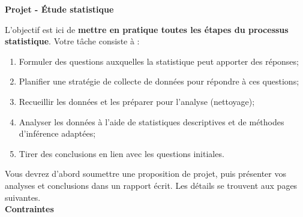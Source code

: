 \documentclass[11pt,french]{article}
\begin{document}
\vspace*{0.05 in}
\begin{center}
\textbf{Projet - Étude statistique} \\
\end{center}



\vspace{2mm}

L'objectif est ici de \textbf{mettre en pratique toutes les étapes du processus statistique}. Votre tâche consiste à :
\begin{enumerate}
\item Formuler des questions auxquelles la statistique peut apporter des réponses;
\item Planifier une stratégie de collecte de données pour répondre à ces questions;
\item Recueillir les données et les préparer pour l’analyse (nettoyage);
\item Analyser les données à l’aide de statistiques descriptives et de méthodes d’inférence adaptées;
\item Tirer des conclusions en lien avec les questions initiales.
\end{enumerate}

Vous devrez d’abord soumettre une proposition de projet, puis présenter vos analyses et conclusions dans un rapport écrit. Les détails se trouvent aux pages suivantes. \\


\textbf{Contraintes}
\end{document}
